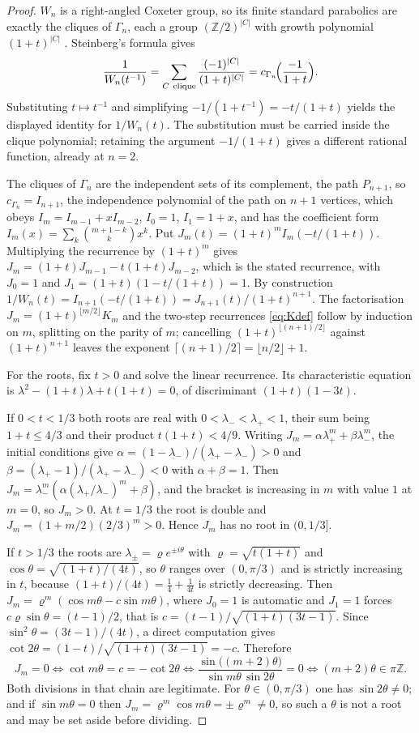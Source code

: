\documentclass[11pt,a4paper]{article}
\newcommand{\Z}{\mathbb{Z}}
\theoremstyle{definition}
\theoremstyle{remark}
\theoremstyle{plain}
\begin{document}
\begin{proof}
$W_n$ is a right-angled Coxeter group, so its finite standard parabolics are exactly the cliques
of $\Gamma_n$, each a group $(\Z/2)^{|C|}$ with growth polynomial $(1+t)^{|C|}$ \cite{Davis}.
Steinberg's formula \cite{Steinberg,Bourbaki,humphreys90} gives
\[
\frac{1}{W_n(t^{-1})}=\sum_{C\ \mathrm{clique}}\frac{(-1)^{|C|}}{(1+t)^{|C|}}
=c_{\Gamma_n}\!\Bigl(\frac{-1}{1+t}\Bigr).
\]
Substituting $t\mapsto t^{-1}$ and simplifying $-1/(1+t^{-1})=-t/(1+t)$ yields the displayed
identity for $1/W_n(t)$. The substitution must be carried inside the clique polynomial;
retaining the argument $-1/(1+t)$ gives a different rational function, already at $n=2$.

The cliques of $\Gamma_n$ are the independent sets of its complement, the path $P_{n+1}$, so
$c_{\Gamma_n}=I_{n+1}$, the independence polynomial of the path on $n+1$ vertices, which obeys
$I_m=I_{m-1}+xI_{m-2}$, $I_0=1$, $I_1=1+x$, and has the coefficient form
$I_m(x)=\sum_k\binom{m+1-k}{k}x^k$. Put $J_m(t)=(1+t)^mI_m(-t/(1+t))$. Multiplying the
recurrence by $(1+t)^m$ gives $J_m=(1+t)J_{m-1}-t(1+t)J_{m-2}$, which is the stated recurrence,
with $J_0=1$ and $J_1=(1+t)(1-t/(1+t))=1$. By construction
$1/W_n(t)=I_{n+1}(-t/(1+t))=J_{n+1}(t)/(1+t)^{n+1}$. The factorisation
$J_m=(1+t)^{\lfloor m/2\rfloor}K_m$ and the two-step recurrences \eqref{eq:Kdef} follow by
induction on $m$, splitting on the parity of $m$; cancelling $(1+t)^{\lfloor(n+1)/2\rfloor}$
against $(1+t)^{n+1}$ leaves the exponent $\lceil(n+1)/2\rceil=\lfloor n/2\rfloor+1$.

For the roots, fix $t>0$ and solve the linear recurrence. Its characteristic equation is
$\lambda^2-(1+t)\lambda+t(1+t)=0$, of discriminant $(1+t)(1-3t)$.

If $0<t<1/3$ both roots are real with $0<\lambda_-<\lambda_+<1$, their sum being $1+t\le4/3$ and
their product $t(1+t)<4/9$. Writing $J_m=\alpha\lambda_+^m+\beta\lambda_-^m$, the initial
conditions give $\alpha=(1-\lambda_-)/(\lambda_+-\lambda_-)>0$ and
$\beta=(\lambda_+-1)/(\lambda_+-\lambda_-)<0$ with $\alpha+\beta=1$. Then
$J_m=\lambda_-^m(\alpha(\lambda_+/\lambda_-)^m+\beta)$, and the bracket is increasing in $m$
with value $1$ at $m=0$, so $J_m>0$. At $t=1/3$ the root is double and $J_m=(1+m/2)(2/3)^m>0$.
Hence $J_m$ has no root in $(0,1/3]$.

If $t>1/3$ the roots are $\lambda_\pm=\varrho e^{\pm i\theta}$ with $\varrho=\sqrt{t(1+t)}$ and
$\cos\theta=\sqrt{(1+t)/(4t)}$, so $\theta$ ranges over $(0,\pi/3)$ and is strictly increasing
in $t$, because $(1+t)/(4t)=\tfrac14+\tfrac1{4t}$ is strictly decreasing. Then
$J_m=\varrho^m(\cos m\theta-c\sin m\theta)$, where $J_0=1$ is automatic and $J_1=1$ forces
$c\varrho\sin\theta=(t-1)/2$, that is $c=(t-1)/\sqrt{(1+t)(3t-1)}$. Since
$\sin^2\theta=(3t-1)/(4t)$, a direct computation gives
$\cot2\theta=(1-t)/\sqrt{(1+t)(3t-1)}=-c$. Therefore
\[
J_m=0\iff\cot m\theta=c=-\cot2\theta
\iff\frac{\sin\bigl((m+2)\theta\bigr)}{\sin m\theta\,\sin2\theta}=0
\iff(m+2)\theta\in\pi\Z .
\]
Both divisions in that chain are legitimate. For $\theta\in(0,\pi/3)$ one has $\sin2\theta\ne0$;
and if $\sin m\theta=0$ then $J_m=\varrho^m\cos m\theta=\pm\varrho^m\ne0$, so such a $\theta$ is
not a root and may be set aside before dividing.


\end{proof}
\end{document}
